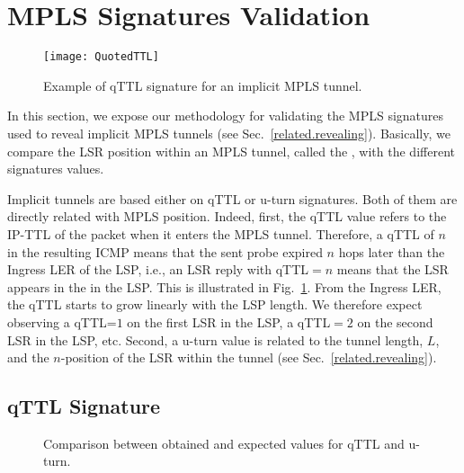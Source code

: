 \section{MPLS Signatures Validation}\label{validation}
\begin{figure}[!t]
  \begin{center}
    \texttt{[image: QuotedTTL]}
  \end{center}
  \caption{Example of qTTL signature for an implicit MPLS tunnel.}
  \label{validation.qTTLFig}
\end{figure}

In this section, we expose our methodology for validating the MPLS
signatures used to reveal implicit MPLS tunnels (see Sec.~\ref{related.revealing}).
Basically, we compare the LSR position within an MPLS tunnel, called the
, with the different signatures values. 

Implicit tunnels are based either on qTTL or u-turn signatures. Both of them are
directly related with MPLS position.  Indeed, first, the qTTL value refers to
the IP-TTL of the \echorequest packet when it enters the MPLS tunnel. 
Therefore, a qTTL of $n$ in the resulting ICMP \ttlexceeded means that the sent
probe expired $n$ hops later than the Ingress LER of the LSP, i.e., an LSR reply
with qTTL$=n$ means that the LSR appears in the  in the LSP. 
This is illustrated in Fig.~\ref{validation.qTTLFig}.  From the Ingress LER, the
qTTL starts to grow linearly with the LSP length.  We therefore expect observing
a qTTL=$1$ on the first LSR in the LSP, a qTTL$=2$ on the second LSR in the LSP,
etc.  Second, a u-turn value is related to the tunnel length, $L$, and the
$n$-position of the LSR within the tunnel (see Sec.~\ref{related.revealing}).

\subsection{qTTL Signature}\label{validation.qttl}
\begin{figure}[!t]
  \begin{center}
\hspace{-0.3cm}      
  \end{center}
  \caption{Comparison between obtained and expected values for qTTL and u-turn.}
  \label{validation.qttl.fig}
\end{figure}

